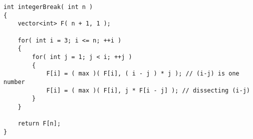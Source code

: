 \setcounter{lstlisting}{0}
\begin{lstlisting}[style=customc, caption={Dynamic Programming}]
int integerBreak( int n )
{
    vector<int> F( n + 1, 1 );

    for( int i = 3; i <= n; ++i )
    {
        for( int j = 1; j < i; ++j )
        {
            F[i] = ( max )( F[i], ( i - j ) * j ); // (i-j) is one number
            F[i] = ( max )( F[i], j * F[i - j] ); // dissecting (i-j)
        }
    }

    return F[n];
}

\end{lstlisting}